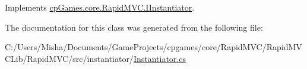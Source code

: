 Implements \mbox{\hyperlink{interfacecp_games_1_1core_1_1_rapid_m_v_c_1_1_i_instantiator_a371da21e60164cf08f32fb39fb184584}{cp\+Games.\+core.\+Rapid\+M\+V\+C.\+I\+Instantiator}}.



The documentation for this class was generated from the following file\+:\begin{DoxyCompactItemize}
\item 
C\+:/\+Users/\+Misha/\+Documents/\+Game\+Projects/cpgames/core/\+Rapid\+M\+V\+C/\+Rapid\+M\+V\+C\+Lib/\+Rapid\+M\+V\+C/src/instantiator/\mbox{\hyperlink{_instantiator_8cs}{Instantiator.\+cs}}\end{DoxyCompactItemize}

